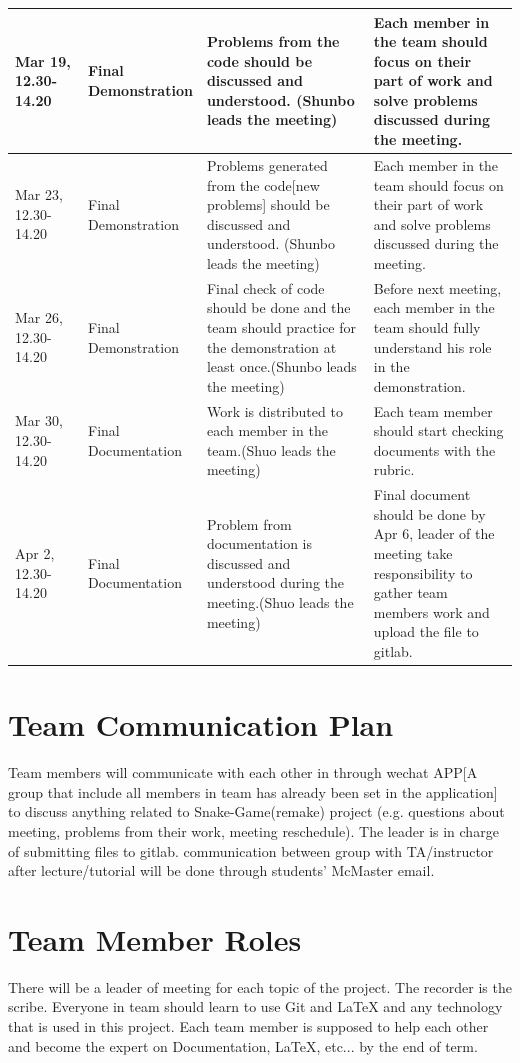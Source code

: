 \documentclass{article}
\begin{document}
        \begin{tabular}{ |p{0.15\linewidth}|p{0.20\linewidth}|p{0.35\linewidth}|p{0.30\linewidth}| }
        \hline
        Mar 19, 12.30-14.20 & Final Demonstration & Problems from the code should be discussed and understood. (Shunbo leads the meeting) & Each member in the team should focus on their part of work and solve problems discussed during the meeting. \\
        \hline
        Mar 23, 12.30-14.20 & Final Demonstration & Problems generated from the code[new problems] should be discussed and understood. (Shunbo leads the meeting) & Each member in the team should focus on their part of work and solve problems discussed during the meeting. \\
        \hline
        Mar 26, 12.30-14.20 & Final Demonstration & Final check of code should be done and the team should practice for the demonstration at least once.(Shunbo leads the meeting) & Before next meeting, each member in the team should fully understand his role in the demonstration. \\
        \hline
        Mar 30, 12.30-14.20 & Final Documentation & Work is distributed to each member in the team.(Shuo leads the meeting) & Each team member should start checking documents with the rubric. \\
        \hline
        Apr 2, 12.30-14.20 & Final Documentation & Problem from documentation is discussed and understood during the meeting.(Shuo leads the meeting) & Final document should be done by Apr 6, leader of the meeting take responsibility to gather team members work and upload the file to gitlab. \\
        \hline
    \end{tabular}

\section{Team Communication Plan}
    Team members will communicate with each other in  through  wechat APP[A group that include all members in team has already been set in the application] to discuss anything related to Snake-Game(remake) project (e.g. questions about meeting, problems from their work, meeting reschedule). The leader is in charge of submitting files to gitlab. communication between group with TA/instructor after lecture/tutorial will be done through students' McMaster email.
\section{Team Member Roles}
    There will be a leader of meeting for each topic of the project. The recorder is the scribe. Everyone in team should learn to use Git and LaTeX and any technology that is used in this project. Each team member is supposed to help each other and become the expert on Documentation, LaTeX, etc... by the end of term.
\end{document}
